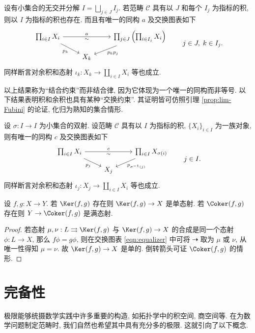 \begin{lemma}[积和余积的结合约束]\label{prop:product-associativity}
	设有小集合的无交并分解 $I = \bigsqcup_{j \in J}  I_j$. 若范畴 $\mathcal{C}$ 具有以 $J$ 和每个 $I_j$ 为指标的积, 则以 $I$ 为指标的积也存在. 而且有唯一的同构 $a$ 及交换图表如下
	\[\begin{tikzcd}[row sep=small]
		 \prod_{i \in I} X_i \arrow[rr, "a", "\sim"'] \arrow[rd, "p_k"'] & & \prod_{j \in J} \left( \prod_{i \in I_j} X_i \right) \arrow[ld, "p_k p_j"] \\
		 & X_k & 
	\end{tikzcd} \qquad j \in J, \; k \in I_j. \]
	同样断言对余积和态射 $\iota_k: X_k \to \coprod_{i \in I} X_i$ 等也成立.
\end{lemma}
以上结果称为``结合约束''而非结合律, 因为它体现为一个唯一的同构而非等号. 以下结果表明积和余积也具有某种``交换约束''. 其证明皆可仿照引理 \ref{prop:lim-Fubini} 的论证, 化归为熟知的集合情形.
\begin{lemma}[积和余积的交换约束]\label{prop:product-commutativity}
	设 $\sigma: I \to I$ 为小集合的双射. 设范畴 $\mathcal{C}$ 具有以 $I$ 为指标的积, $\{X_i\}_{i \in I}$ 为一族对象, 则有唯一的同构 $c$ 及交换图表如下
	\[\begin{tikzcd}[row sep=small]
		\prod_{i \in I} X_i \arrow[rr, "c", "\sim"'] \arrow[rd, "p_j"'] & & \prod_{i \in I} X_{\sigma(i)} \arrow[ld, "p_{\sigma^{-1}(j)}"] \\
		& X_j &
	\end{tikzcd} \qquad j \in I. \]
	同样断言对余积和态射 $\iota_j: X_j \to \coprod_{i \in I} X_i$ 等也成立.
\end{lemma}

\begin{lemma}
	设 $f,g: X \to Y$. 若 $\Ker(f,g)$ 存在则 $\Ker(f,g) \to X$ 是单态射. 若 $\Coker(f,g)$ 存在则 $Y \to \Coker(f,g)$ 是满态射.
\end{lemma}
\begin{proof}
	若态射 $\mu, \nu: L \rightrightarrows \Ker(f,g)$ 与 $\Ker(f,g) \to X$ 的合成是同一个态射 $\phi: L \to X$, 那么 $f\phi = g\phi$, 则在交换图表 \eqref{eqn:equalizer} 中可将 $\dasharrow$ 取为 $\mu$ 或 $\nu$, 从唯一性得知 $\mu=\nu$. 故 $\Ker(f,g) \to X$ 是单的. 倒转箭头可证 $\Coker(f,g)$ 的情形.
\end{proof}

\section{完备性}
极限能够统摄数学实践中许多重要的构造, 如拓扑学中的积空间, 商空间等. 在为数学问题制定范畴时, 我们自然也希望其中具有充分多的极限. 这就引向了以下概念.

